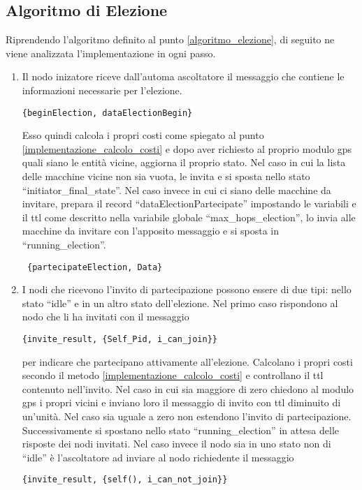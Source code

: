\subsection{Algoritmo di Elezione}
Riprendendo l'algoritmo definito al punto \ref{algoritmo_elezione}, di seguito ne viene analizzata l'implementazione in ogni passo.
\begin{enumerate}
	\item Il nodo inizatore riceve dall'automa ascoltatore il messaggio che contiene le informazioni necessarie per l'elezione. 

	\lstinline|{beginElection, dataElectionBegin}|

	Esso quindi calcola i propri costi come spiegato al punto \ref{implementazione_calcolo_costi} e dopo aver richiesto al proprio modulo gps quali siano le entità vicine, aggiorna il proprio stato. Nel caso in cui la lista delle macchine vicine non sia vuota, le invita e si sposta nello stato ``initiator\_final\_state''. Nel caso invece in cui ci siano delle macchine da invitare, prepara il record ``dataElectionPartecipate'' impostando le variabili e il ttl come descritto nella variabile globale ``max\_hops\_election'', lo invia alle macchine da invitare con l'apposito messaggio e si sposta in ``running\_election''.

	\lstinline| {partecipateElection, Data} |
	\item I nodi che ricevono l'invito di partecipazione possono essere di due tipi: nello stato ``idle'' e in un altro stato dell'elezione. Nel primo caso rispondono al nodo che li ha invitati con il messaggio 

	\lstinline |{invite_result, {Self_Pid, i_can_join}}|
	
	per indicare che partecipano attivamente all'elezione. Calcolano i propri costi secondo il metodo \ref{implementazione_calcolo_costi} e controllano il ttl contenuto nell'invito. Nel caso in cui sia maggiore di zero chiedono al modulo gps i propri vicini e inviano loro il messaggio di invito con ttl diminuito di un'unità. Nel caso sia uguale a zero non estendono l'invito di partecipazione. Successivamente si spostano nello stato ``running\_election'' in attesa delle risposte dei nodi invitati. Nel caso invece il nodo sia in uno stato non di ``idle'' è l'ascoltatore ad inviare al nodo richiedente il messaggio

	\lstinline |{invite_result, {self(), i_can_not_join}}|


\end{enumerate}
